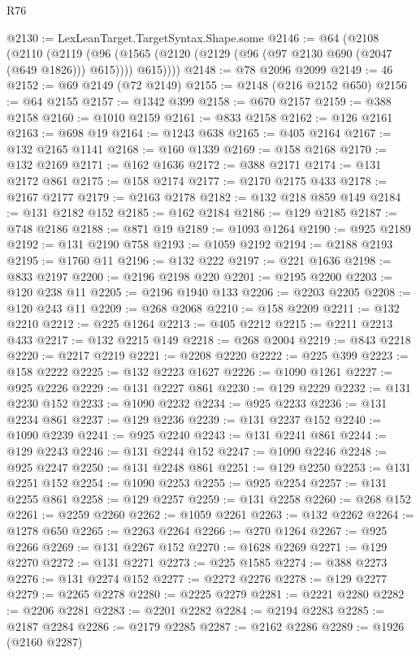 \begin{lexlean}{R76}
\begin{coremodule}
@2130 := LexLeanTarget.TargetSyntax.Shape.some
@2146 := @64
    (@2108
      (@2110
        (@2119
          (@96 (@1565 (@2120 (@2129 (@96 (@97 @2130 @690 (@2047 (@649 @1826))) @615)))) @615))))
@2148 := @78 @2096 @2099
@2149 := 46
@2152 := @69 @2149 (@72 @2149)
@2155 := @2148 (@216 @2152 @650)
@2156 := @64 @2155
@2157 := @1342 @399
@2158 := @670 @2157
@2159 := @388 @2158
@2160 := @1010 @2159
@2161 := @833 @2158
@2162 := @126 @2161
@2163 := @698 @19
@2164 := @1243 @638
@2165 := @405 @2164
@2167 := @132 @2165 @1141
@2168 := @160 @1339
@2169 := @158 @2168
@2170 := @132 @2169
@2171 := @162 @1636
@2172 := @388 @2171
@2174 := @131 @2172 @861
@2175 := @158 @2174
@2177 := @2170 @2175 @433
@2178 := @2167 @2177
@2179 := @2163 @2178
@2182 := @132 @218 @859 @149
@2184 := @131 @2182 @152
@2185 := @162 @2184
@2186 := @129 @2185
@2187 := @748 @2186
@2188 := @871 @19
@2189 := @1093 @1264
@2190 := @925 @2189
@2192 := @131 @2190 @758
@2193 := @1059 @2192
@2194 := @2188 @2193
@2195 := @1760 @11
@2196 := @132 @222
@2197 := @221 @1636
@2198 := @833 @2197
@2200 := @2196 @2198 @220
@2201 := @2195 @2200
@2203 := @120 @238 @11
@2205 := @2196 @1940 @133
@2206 := @2203 @2205
@2208 := @120 @243 @11
@2209 := @268 @2068
@2210 := @158 @2209
@2211 := @132 @2210
@2212 := @225 @1264
@2213 := @405 @2212
@2215 := @2211 @2213 @433
@2217 := @132 @2215 @149
@2218 := @268 @2004
@2219 := @843 @2218
@2220 := @2217 @2219
@2221 := @2208 @2220
@2222 := @225 @399
@2223 := @158 @2222
@2225 := @132 @2223 @1627
@2226 := @1090 @1261
@2227 := @925 @2226
@2229 := @131 @2227 @861
@2230 := @129 @2229
@2232 := @131 @2230 @152
@2233 := @1090 @2232
@2234 := @925 @2233
@2236 := @131 @2234 @861
@2237 := @129 @2236
@2239 := @131 @2237 @152
@2240 := @1090 @2239
@2241 := @925 @2240
@2243 := @131 @2241 @861
@2244 := @129 @2243
@2246 := @131 @2244 @152
@2247 := @1090 @2246
@2248 := @925 @2247
@2250 := @131 @2248 @861
@2251 := @129 @2250
@2253 := @131 @2251 @152
@2254 := @1090 @2253
@2255 := @925 @2254
@2257 := @131 @2255 @861
@2258 := @129 @2257
@2259 := @131 @2258
@2260 := @268 @152
@2261 := @2259 @2260
@2262 := @1059 @2261
@2263 := @132 @2262
@2264 := @1278 @650
@2265 := @2263 @2264
@2266 := @270 @1264
@2267 := @925 @2266
@2269 := @131 @2267 @152
@2270 := @1628 @2269
@2271 := @129 @2270
@2272 := @131 @2271
@2273 := @225 @1585
@2274 := @388 @2273
@2276 := @131 @2274 @152
@2277 := @2272 @2276
@2278 := @129 @2277
@2279 := @2265 @2278
@2280 := @2225 @2279
@2281 := @2221 @2280
@2282 := @2206 @2281
@2283 := @2201 @2282
@2284 := @2194 @2283
@2285 := @2187 @2284
@2286 := @2179 @2285
@2287 := @2162 @2286
@2289 := @1926 (@2160 @2287)

\end{coremodule}
\end{lexlean}
